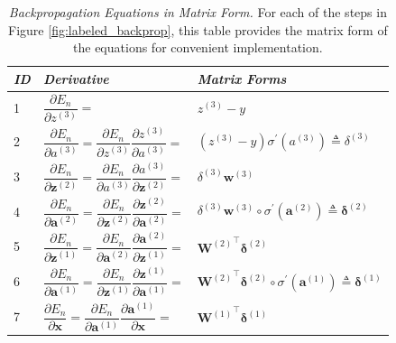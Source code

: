 \documentclass{article}
\begin{document}
\begin{table}[h]
\centering
\label{tab:matrix}
\caption{\emph{Backpropagation Equations in Matrix Form.} For each of the steps in Figure \ref{fig:labeled_backprop}, this table provides the matrix form of the equations for convenient implementation.}
\begin{tabular}{lll}
\toprule
\emph{ID} & \emph{Derivative} & \emph{Matrix Forms} \\
\midrule
1 & $\dfrac{\partial E_n}{\partial z^{(3)}} =$ & $z^{(3)} - y$ \\[4ex]

2 & $\dfrac{\partial E_n}{\partial a^{(3)}} = \dfrac{\partial E_n}{\partial z^{(3)}} \dfrac{\partial z^{(3)}}{\partial a^{(3)}}=$ & $(z^{(3)} - y) \sigma^{'}(a^{(3)}) \triangleq \delta^{(3)}$  \\[4ex]

3 & $\dfrac{\partial E_n}{\partial \mathbf{z}^{(2)}} = \dfrac{\partial E_n}{\partial a^{(3)}} \dfrac{\partial a^{(3)}}{\partial \mathbf{z}^{(2)}} =$ & $ \delta^{(3)} \mathbf{w}^{(3)}$  \\[4ex]

4 & $\dfrac{\partial E_n}{\partial \mathbf{a}^{(2)}} = \dfrac{\partial E_n}{\partial \mathbf{z}^{(2)}} \dfrac{\partial \mathbf{z}^{(2)}}{\partial \mathbf{a}^{(2)}} =$ & $ \delta^{(3)} \mathbf{w}^{(3)} \circ \sigma^{'}(\mathbf{a}^{(2)}) \triangleq \bm{\delta}^{(2)}$  \\[4ex]

5 & $\dfrac{\partial E_n}{\partial \mathbf{z}^{(1)}} = \dfrac{\partial E_n}{\partial \mathbf{a}^{(2)}} \dfrac{\partial \mathbf{a}^{(2)}}{\partial \mathbf{z}^{(1)}}=$ & $ {\mathbf{W}^{(2)}}^{\top} \bm{\delta}^{(2)}$  \\[4ex]

6 &  $\dfrac{\partial E_n}{\partial \mathbf{a}^{(1)}} = \dfrac{\partial E_n}{\partial \mathbf{z}^{(1)}} \dfrac{\partial \mathbf{z}^{(1)}}{\partial \mathbf{a}^{(1)}} =$ & $ {\mathbf{W}^{(2)}}^{\top} \bm{\delta}^{(2)} \circ \sigma^{'}(\mathbf{a}^{(1)}) \triangleq \bm{\delta}^{(1)}$ \\[4ex]

7 & $\dfrac{\partial E_n}{\partial \mathbf{x}} =\dfrac{\partial E_n}{\partial \mathbf{a}^{(1)}} \dfrac{\partial \mathbf{a}^{(1)}}{\partial \mathbf{x}}=$ & $ {\mathbf{W}^{(1)}}^{\top} \bm{\delta}^{(1)}$ \\[4ex]

\bottomrule
\end{tabular}
\end{table}
\end{document}
